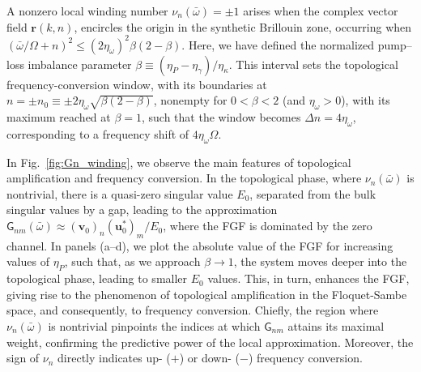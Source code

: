 \documentclass[prl,twocolumn,floatfix,10pt,superscriptaddress]{revtex4-2}
\newcommand{\msf}[1]{\mathsf{#1}}
\newcommand{\bsb}[1]{\boldsymbol{#1}}
\newcommand{\bomega}{{\bar{\omega}}}
\newcommand{\msG}{{\msf{G}}}
\begin{document}
A nonzero local winding number $ \nu_n(\bomega) = \pm1 $ arises when the complex vector field $\bsb{r}(k,n)$, encircles the origin in the synthetic Brillouin zone, occurring when $({\bomega/\Omega+n})^2\le(2\eta_\omega)^2\beta(2-\beta)$. Here, we have defined the normalized pump--loss imbalance parameter  
$\beta\equiv(\eta_P-\eta_\gamma)/\eta_\kappa$. This interval sets the topological frequency-conversion window, with its boundaries at $n=\pm n_0\equiv\pm 2\eta_\omega \sqrt{\beta(2-\beta)}$, nonempty for $0<\beta<2$ (and $\eta_\omega>0$), with its maximum reached at $\beta=1$, such that the window becomes $\Delta n=4\eta_\omega$, corresponding to a frequency shift of $4\eta_\omega \Omega$.

In Fig.~\ref{fig:Gn_winding}, we observe the main features of topological amplification and frequency conversion. In the topological phase, where $\nu_n(\bar\omega)$ is nontrivial, there is a quasi-zero singular value $E_0$, separated from the bulk singular values by a gap, leading to the approximation $\msG_{nm}(\bar\omega)\approx (\bsb{v}_0)_n (\bsb{u}_0^*)_m/E_0$, where the FGF is dominated by the zero channel. In panels (a–d), we plot the absolute value of the FGF for increasing values of $\eta_P$, such that, as we approach $\beta\rightarrow 1$, the system moves deeper into the topological phase, leading to smaller $E_0$ values. This, in turn, enhances the FGF, giving rise to the phenomenon of topological amplification in the Floquet-Sambe space, and consequently, to frequency conversion. Chiefly, the region where $\nu_n(\bar\omega)$ is nontrivial pinpoints the indices at which $\msG_{nm}$ attains its maximal weight, confirming the predictive power of the local approximation. Moreover, the sign of $\nu_n$ directly indicates up- ($+$) or down- ($-$) frequency conversion.
\end{document}

